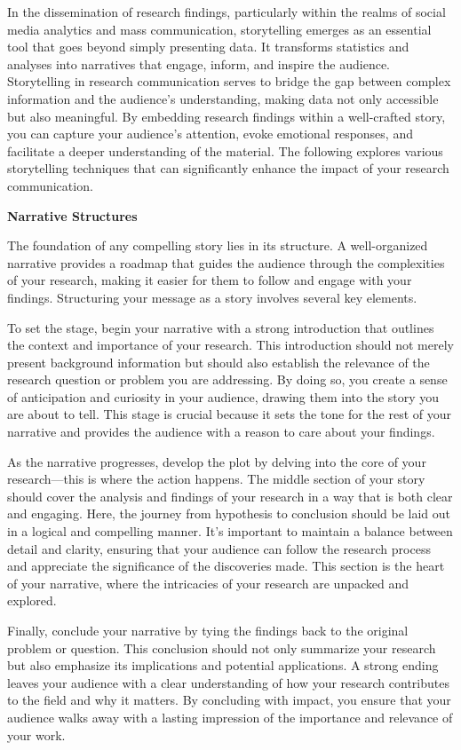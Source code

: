 \documentclass[
]{book}
\begin{document}
In the dissemination of research findings, particularly within the realms of social media analytics and mass communication, storytelling emerges as an essential tool that goes beyond simply presenting data. It transforms statistics and analyses into narratives that engage, inform, and inspire the audience. Storytelling in research communication serves to bridge the gap between complex information and the audience's understanding, making data not only accessible but also meaningful. By embedding research findings within a well-crafted story, you can capture your audience's attention, evoke emotional responses, and facilitate a deeper understanding of the material. The following explores various storytelling techniques that can significantly enhance the impact of your research communication.

\textbf{Narrative Structures}

The foundation of any compelling story lies in its structure. A well-organized narrative provides a roadmap that guides the audience through the complexities of your research, making it easier for them to follow and engage with your findings. Structuring your message as a story involves several key elements.

To set the stage, begin your narrative with a strong introduction that outlines the context and importance of your research. This introduction should not merely present background information but should also establish the relevance of the research question or problem you are addressing. By doing so, you create a sense of anticipation and curiosity in your audience, drawing them into the story you are about to tell. This stage is crucial because it sets the tone for the rest of your narrative and provides the audience with a reason to care about your findings.

As the narrative progresses, develop the plot by delving into the core of your research---this is where the action happens. The middle section of your story should cover the analysis and findings of your research in a way that is both clear and engaging. Here, the journey from hypothesis to conclusion should be laid out in a logical and compelling manner. It's important to maintain a balance between detail and clarity, ensuring that your audience can follow the research process and appreciate the significance of the discoveries made. This section is the heart of your narrative, where the intricacies of your research are unpacked and explored.

Finally, conclude your narrative by tying the findings back to the original problem or question. This conclusion should not only summarize your research but also emphasize its implications and potential applications. A strong ending leaves your audience with a clear understanding of how your research contributes to the field and why it matters. By concluding with impact, you ensure that your audience walks away with a lasting impression of the importance and relevance of your work.
\end{document}
